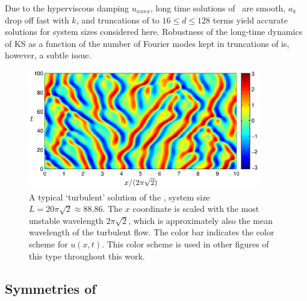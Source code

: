 Due to the hyperviscous damping $u_{xxxx}$, long time solutions of
\KSe\ are smooth, $a_k$ drop off fast with $k$,
and truncations of  to $16 \leq d \leq 128$  terms
yield accurate solutions for system sizes considered here.
Robustness of the long-time dynamics of KS as a function of the
number of Fourier modes kept in truncations of  is, however,
a subtle issue.

\begin{figure}[t]
\begin{center}
\includegraphics[width=0.9\textwidth]{figs/ks_largeL_cbar.eps}
\end{center}
\caption{
A typical `turbulent' solution of the \KSe, system size
$L=20\pi\sqrt{2}\approx 88.86$.  The $x$ coordinate is scaled
with the most unstable wavelength $2\pi\sqrt{2}$, which is
approximately also the mean wavelength of the turbulent flow.
The color bar indicates the color scheme for $u(x,t)$.  This color
scheme is used in other figures of this type throughout this work.
     } \label{f:ks_largeL}
\end{figure}

\subsection{Symmetries of \KSe}
\label{sec:KSeSymm}

